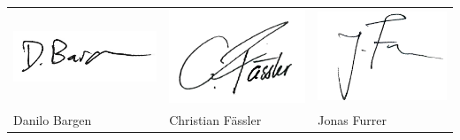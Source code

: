 \begin{tabular}{p{5.5cm} p{5.5cm} p{5.5cm}}
	\includegraphics[scale=0.7]{images/unterschrift-danilo} &
	\includegraphics[scale=0.7]{images/unterschrift-chrigi} &
	\includegraphics[scale=0.7]{images/unterschrift-jonas} \\
	Danilo Bargen & Christian Fässler & Jonas Furrer
\end{tabular} 
